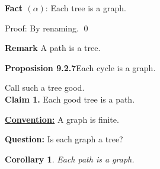 \documentclass{article}
\newcommand{\sn}{\smallskip\noindent}
\newcommand{\mn}{\sn\medskip}
\begin{document}
\mn
\textbf{Fact $(\alpha)$}: Each tree is a graph.

\sn
Proof: By renaming. \qed

{
{\noindent \bf Remark}  A path is a tree.
}

{\bf Proposision 9.2.7}\quad Each cycle is a graph.

Call such a tree good.\\[5pt] \noindent
\textbf{Claim 1.}  Each good tree is a path.

{\underline {\bf Convention:}} A graph is finite.

\!\!\!\! \textbf{Question:}
Is each graph a tree?

\newtheorem{corollary}{Corollary}
\begin{corollary}
Each path is a graph.
\end{corollary}
\end{document}
